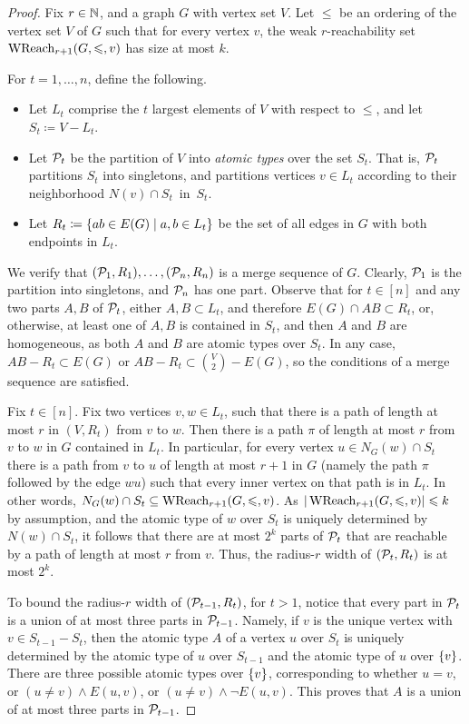 \begin{proof}Fix $r\in\N$, and a graph $G$ with vertex set $V$.
Let $\le$ be an ordering of the vertex set $V$ of $G$ 
such that for every vertex \(v\), the weak $r$-reachability set $\wreach_{r+1}(G,\le,v)$ has size at most $k$.

For $t=1,\ldots,n$, define the following.
\begin{itemize}
  \item Let $L_t$ comprise the $t$ largest elements of $V$ with respect to $\le$, and let $S_t\coloneqq V-L_t$.
  \item Let  $\cal P_t$ be the partition of $V$ into \emph{atomic types}
  over the set $S_t$. That is, $\cal P_t$ partitions $S_t$ into singletons, and partitions vertices  $v\in L_t$ according to their neighborhood $N(v)\cap S_t$~in~$S_t$.
  \item Let $R_t \coloneqq\setof{ab\in E(G)}{a,b\in L_t}$ be the set of all edges in $G$ with both endpoints in $L_t$.
\end{itemize}
We verify that $(\cal P_1,R_1),\ldots,(\cal P_n,R_n)$ is a merge sequence of $G$. Clearly, $\cal P_1$ is the partition into singletons, 
and $\cal P_n$ has one part.
Observe that for $t\in[n]$ and any two parts $A,B$ of $\cal P_t$,
either $A,B\subset L_t$, and therefore  $E(G)\cap AB\subset R_t$,
or, otherwise, at least one of $A,B$ is contained in $S_t$, and then $A$ and $B$ are homogeneous,
as both $A$ and  $B$ are atomic types over $S_t$. 
In any case, $AB-R_t\subset E(G)$ or 
$AB-R_t\subset {V\choose 2}-E(G)$, so the conditions of a merge sequence are satisfied.


Fix $t\in[n]$. Fix two vertices $v,w\in L_t$, such that 
there is a path of length at most $r$ in $(V,R_t)$ from $v$ to $w$.
Then there is a path $\pi$ of length at most \(r\) from $v$ to $w$ in $G$
contained in $L_t$.
In particular, for every vertex $u\in N_G(w)\cap S_t$ 
there is a path from $v$ to $u$ of length at most $r+1$ in \(G\) (namely the path $\pi$ followed by the edge $wu$) such that every inner vertex on that path is in $L_t$.
In other words, $N_G(w)\cap S_t \subseteq \wreach_{r+1}(G,\le,v)$.
 As $|\wreach_{r+1}(G,\le,v)|\le k$ by assumption, and 
 the atomic type of $w$ over $S_t$ is uniquely 
determined by $N(w)\cap S_t$, it follows that 
there are at most $2^k$ parts of $\cal P_t$ 
that are reachable by a path of length at most $r$ from $v$.
Thus, the radius-$r$ width of $(\cal P_t,R_t)$ is at most
$2^k$.



To bound the radius-$r$ width of $(\cal P_{t-1},R_t)$, for $t>1$, notice that every part in $\cal P_{t}$ 
is a union of at most three parts in $\cal P_{t-1}$.
 Namely, if $v$ is the unique vertex with $v\in S_{t-1}-S_{t}$, then the atomic type $A$ of a vertex $u$ over $S_{t}$ 
 is uniquely determined by the atomic type of $u$ over $S_{t-1}$ and the atomic type of $u$ over $\set v$. 
 There are three 
 possible atomic types over $\set v$, corresponding 
 to
 whether $u=v$, or $(u\neq v)\land E(u,v)$, or 
$(u\neq v)\land \neg E(u,v)$. This proves that $A$ is a union of at most three parts in $\cal P_{t-1}$.


\end{proof}
